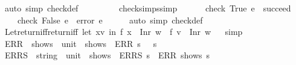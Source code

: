 \begin{isabellebody}
\isamarkupfalse%
\ {\isacharparenleft}{\kern0pt}auto\ simp{\isacharcolon}{\kern0pt}\ check{\isacharunderscore}{\kern0pt}def{\isacharparenright}{\kern0pt}%
\endisatagproof
{\isafoldproof}%
%
\isadelimproof
\isanewline
%
\endisadelimproof
\ \ \isanewline
\ \ \isanewline
\ \ \isamarkupfalse%
\ check{\isacharunderscore}{\kern0pt}simps{\isacharbrackleft}{\kern0pt}simp{\isacharbrackright}{\kern0pt}{\isacharcolon}{\kern0pt}\ \ \isanewline
\ \ \ \ {\isachardoublequoteopen}check\ True\ e\ {\isacharequal}{\kern0pt}\ succeed{\isachardoublequoteclose}\isanewline
\ \ \ \ {\isachardoublequoteopen}check\ False\ e\ {\isacharequal}{\kern0pt}\ error\ e{\isachardoublequoteclose}\isanewline
%
\isadelimproof
\ \ \ \ %
\endisadelimproof
%
\isatagproof
{}\isamarkupfalse%
\ {\isacharparenleft}{\kern0pt}auto\ simp{\isacharcolon}{\kern0pt}\ check{\isacharunderscore}{\kern0pt}def{\isacharparenright}{\kern0pt}%
\endisatagproof
{\isafoldproof}%
%
\isadelimproof
\isanewline
%
\endisadelimproof
\ \ \ \ \ \ \ \ \isanewline
\ \ \isamarkupfalse%
\ Let{\isacharunderscore}{\kern0pt}return{\isacharunderscore}{\kern0pt}iff{\isacharbrackleft}{\kern0pt}return{\isacharunderscore}{\kern0pt}iff{\isacharbrackright}{\kern0pt}{\isacharcolon}{\kern0pt}\ {\isachardoublequoteopen}{\isacharparenleft}{\kern0pt}let\ x{\isacharequal}{\kern0pt}v\ in\ f\ x{\isacharparenright}{\kern0pt}\ {\isacharequal}{\kern0pt}\ Inr\ w\ {\isasymlongleftrightarrow}\ f\ v\ {\isacharequal}{\kern0pt}\ Inr\ w{\isachardoublequoteclose}%
\isadelimproof
\ %
\endisadelimproof
%
\isatagproof
{}\isamarkupfalse%
\ simp%
\endisatagproof
{\isafoldproof}%
%
\isadelimproof
%
\endisadelimproof
\isanewline
\isanewline
\ \ \isanewline
\ \ \isamarkupfalse%
\ ERR\ {\isacharcolon}{\kern0pt}{\isacharcolon}{\kern0pt}\ {\isachardoublequoteopen}shows\ {\isasymRightarrow}\ {\isacharparenleft}{\kern0pt}unit\ {\isasymRightarrow}\ shows{\isacharparenright}{\kern0pt}{\isachardoublequoteclose}\ \ {\isachardoublequoteopen}ERR\ s\ {\isasymequiv}\ {\isasymlambda}{\isacharunderscore}{\kern0pt}{\isachardot}{\kern0pt}\ s{\isachardoublequoteclose}\isanewline
\ \ \isamarkupfalse%
\ ERRS\ {\isacharcolon}{\kern0pt}{\isacharcolon}{\kern0pt}\ {\isachardoublequoteopen}string\ {\isasymRightarrow}\ {\isacharparenleft}{\kern0pt}unit\ {\isasymRightarrow}\ shows{\isacharparenright}{\kern0pt}{\isachardoublequoteclose}\ \ {\isachardoublequoteopen}ERRS\ s\ {\isasymequiv}\ ERR\ {\isacharparenleft}{\kern0pt}shows\ s{\isacharparenright}{\kern0pt}{\isachardoublequoteclose}\isanewline

\end{isabellebody}
